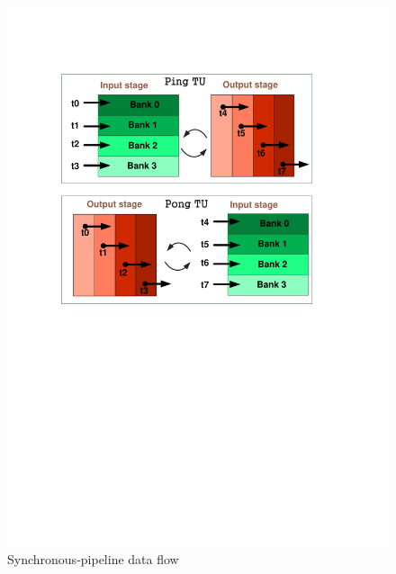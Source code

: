 \documentclass[10pt,journal,compsoc]{IEEEtran}
\begin{document}
 \begin{figure}[htpb]
 \begin{center}
 \graphicspath{{picture/}}
 \includegraphics[scale=0.5]{PPTU_v02}
 \caption{Synchronous-pipeline data flow }
 \label{fig:PPTU}
 \end{center}
 \end{figure}
\end{document}
